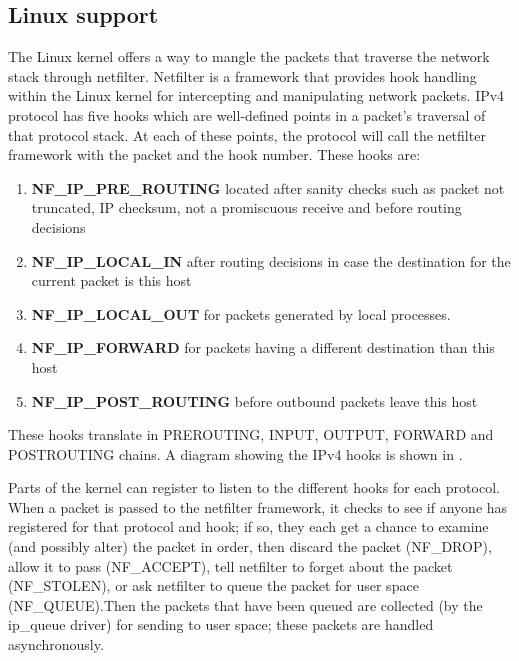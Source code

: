 {{\subsection{Linux support}
\label{sub-sec:nat-linux}
The Linux kernel offers a way to mangle the packets that traverse the network stack through netfilter. Netfilter is a framework that provides hook handling within the Linux kernel for intercepting and manipulating network packets. IPv4 protocol has five hooks which are well-defined points in a packet's traversal of that protocol stack. At each of these points, the protocol will call the netfilter framework with the packet and the hook number.
These hooks are:
\begin{enumerate}
\item \textbf{NF_IP_PRE_ROUTING} located after sanity checks such as packet not truncated, IP checksum, not a promiscuous receive and before routing decisions 
\item \textbf{NF_IP_LOCAL_IN} after routing decisions in case the destination for the current packet is this host
\item \textbf{NF_IP_LOCAL_OUT} for packets generated by local processes. 
\item \textbf{NF_IP_FORWARD} for packets having a different destination than this host
\item \textbf{NF_IP_POST_ROUTING} before outbound packets leave this host 
\end{enumerate}
These hooks translate in PREROUTING, INPUT, OUTPUT, FORWARD and POSTROUTING chains.
A diagram showing the IPv4 hooks is shown in .

Parts of the kernel can register to listen to the different hooks for each protocol. When a packet is passed to the netfilter framework, it checks to see if anyone has registered for that protocol and hook; if so, they each get a chance to examine (and possibly alter) the packet in order, then discard the packet (NF_DROP), allow it to pass (NF_ACCEPT), tell netfilter to forget about the packet (NF_STOLEN), or ask netfilter to queue the packet for user space (NF_QUEUE).Then the packets that have been queued are collected (by the ip_queue driver) for sending to user space; these packets are handled asynchronously.

}}
